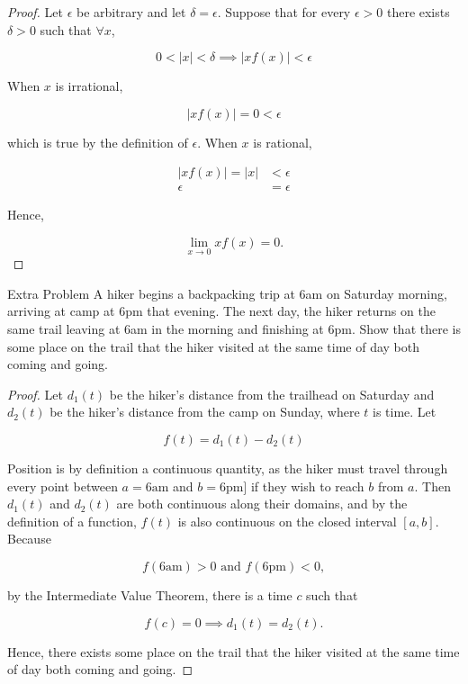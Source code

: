 \documentclass{article}
\begin{document}
    \begin{proof}
        Let $\epsilon$ be arbitrary and let $\delta = \epsilon$. Suppose that for every $\epsilon > 0$ there exists $\delta > 0$ such that $\forall x$,

        \[
            0 < |x| < \delta \implies \left|xf(x)| < \epsilon
        \]

        When $x$ is irrational,

        \[
            \left|xf(x)\right| = 0 < \epsilon
        \]

        which is true by the definition of $\epsilon$. When $x$ is rational,

        \begin{align*}
            \left|xf(x)\right| = |x|      &< \epsilon \\
                                 \epsilon &= \epsilon
        \end{align*}

        Hence,

        \[
            \lim_{x\to 0} xf(x) = 0.
        \]
    \end{proof}

    \begin{tbhtheorem}{Extra Problem}
        A hiker begins a backpacking trip at 6am on Saturday morning, arriving at camp at 6pm that evening. The next day, the hiker returns on the same trail leaving at 6am in the morning and finishing at 6pm.
        Show that there is some place on the trail that the hiker visited at the same time of day both coming and going.
    \end{tbhtheorem}

    \begin{proof}
        Let $d_1(t)$ be the hiker's distance from the trailhead on Saturday and $d_2(t)$ be the hiker's distance from the camp on Sunday, where $t$ is time. Let

        \[
            f(t) = d_1(t) - d_2(t)
        \]

        Position is by definition a continuous quantity, as the hiker must travel through every point between $a=6\text{am}$ and $b=6\text{pm}]$ if they wish to reach $b$ from $a$. Then $d_1(t)$ and $d_2(t)$ are both
        continuous along their domains, and by the definition of a function, $f(t)$ is also continuous on the closed interval $[a,b]$. \\

        Because

        \[
            f(6\text{am}) > 0 \text{ and } f(6\text{pm}) < 0,
        \]

        by the Intermediate Value Theorem, there is a time $c$ such that

        \[
            f(c) = 0 \implies d_1(t) = d_2(t).
        \]

        Hence, there exists some place on the trail that the hiker visited at the same time of day both coming and going.
    \end{proof}
\end{document}
